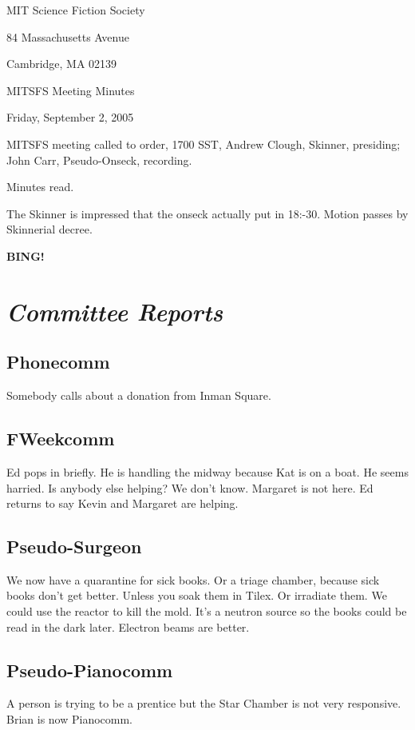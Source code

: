 \documentclass[10pt]{article}
\newcommand{\bing}{{\bf BING!} }
\newcommand{\goto}[1]{\bing \vskip 12pt \section*{{\em{#1}}}}
\begin{document}
\begin{center}

MIT Science Fiction Society

84 Massachusetts Avenue

Cambridge, MA 02139

\vspace{12pt}

MITSFS Meeting Minutes

Friday, September 2, 2005

\end{center}

\vspace{18pt}

\setlength{\parskip}{6pt}

\noindent
MITSFS meeting called to order, 1700 SST, Andrew Clough, 
Skinner, presiding; John Carr,  Pseudo-Onseck, recording.

Minutes read.

The Skinner is impressed that the onseck actually put in 18:-30.
Motion passes by Skinnerial decree.

\goto{Committee Reports}
\subsection*{Phonecomm}
Somebody calls about a donation from Inman Square.

\subsection*{FWeekcomm}
Ed pops in briefly.  He is handling the midway because Kat is on a boat.
He seems harried.  Is anybody else helping?  We don't know.  Margaret is
not here.  Ed returns to say Kevin and Margaret are helping.

\subsection*{Pseudo-Surgeon}
We now have a quarantine for sick books.  Or a triage chamber,
because sick books don't get better.  Unless you soak them in
Tilex.  Or irradiate them.  We could use the reactor to kill
the mold.  It's a neutron source so the books could be read
in the dark later.  Electron beams are better.


\subsection*{Pseudo-Pianocomm}
A person is trying to be a prentice but the Star Chamber is not
very responsive.  Brian is now Pianocomm.
\end{document}
